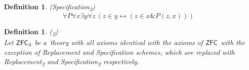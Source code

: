 \documentclass[12pt,a4paper]{article}
\newtheorem{definition}[theorem]{Definition}
\renewcommand{\iff}{\leftrightarrow}
\begin{document}
\begin{definition}{(\emph{Specification}\textsubscript{2})}\\
\begin{equation}
\forall P \forall x \exists y \forall z \, ( z \in y \iff ( z \in x \& P(z, x)))
\end{equation}
\end{definition}

\begin{definition}{(\textsubscript{2})}\\
Let $\sf{ZFC\textsubscript{2}}$ be a~theory with all axioms identical with the axioms of $\sf{ZFC}$ with the exception of \emph{Replacement} and \emph{Specification} schemes, which are replaced with \emph{Replacement}\textsubscript{2} and \emph{Specification}\textsubscript{2} respectively.
\end{definition}












\end{document}
